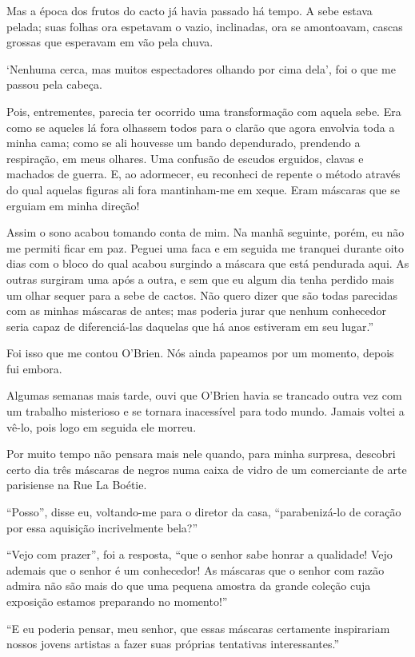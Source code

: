 Mas a época dos frutos do cacto já havia passado há tempo. A sebe estava
pelada; suas folhas ora espetavam o vazio, inclinadas, ora se
amontoavam, cascas grossas que esperavam em vão pela chuva.

`Nenhuma cerca, mas muitos espectadores olhando por cima dela', foi o
que me passou pela cabeça.

Pois, entrementes, parecia ter ocorrido uma transformação com aquela
sebe. Era como se aqueles lá fora olhassem todos para o clarão que agora
envolvia toda a minha cama; como se ali houvesse um bando dependurado,
prendendo a respiração, em meus olhares. Uma confusão de escudos
erguidos, clavas e machados de guerra. E, ao adormecer, eu reconheci de
repente o método através do qual aquelas figuras ali fora mantinham-me
em xeque. Eram máscaras que se erguiam em minha direção!

Assim o sono acabou tomando conta de mim. Na manhã seguinte, porém, eu
não me permiti ficar em paz. Peguei uma faca e em seguida me tranquei
durante oito dias com o bloco do qual acabou surgindo a máscara que está
pendurada aqui. As outras surgiram uma após a outra, e sem que eu algum
dia tenha perdido mais um olhar sequer para a sebe de cactos. Não quero
dizer que são todas parecidas com as minhas máscaras de antes; mas
poderia jurar que nenhum conhecedor seria capaz de diferenciá-las
daquelas que há anos estiveram em seu lugar.''

Foi isso que me contou O'Brien. Nós ainda papeamos por um momento,
depois fui embora.

Algumas semanas mais tarde, ouvi que O'Brien havia se trancado outra vez
com um trabalho misterioso e se tornara inacessível para todo mundo.
Jamais voltei a vê-lo, pois logo em seguida ele morreu.

Por muito tempo não pensara mais nele quando, para minha surpresa,
descobri certo dia três máscaras de negros numa caixa de vidro de um
comerciante de arte parisiense na Rue La Boétie.

``Posso'', disse eu, voltando-me para o diretor da casa, ``parabenizá-lo
de coração por essa aquisição incrivelmente bela?''

``Vejo com prazer'', foi a resposta, ``que o senhor sabe honrar a
qualidade! Vejo ademais que o senhor é um conhecedor! As máscaras que o
senhor com razão admira não são mais do que uma pequena amostra da
grande coleção cuja exposição estamos preparando no momento!''

``E eu poderia pensar, meu senhor, que essas máscaras certamente
inspirariam nossos jovens artistas a fazer suas próprias tentativas
interessantes.''

